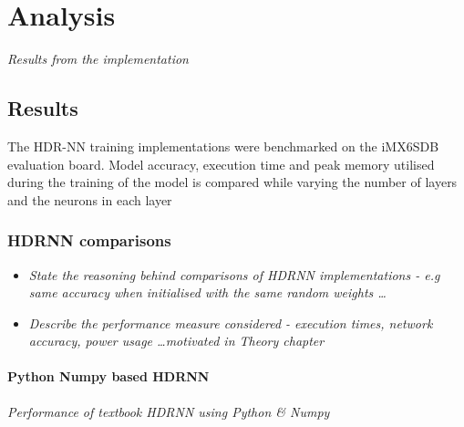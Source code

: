 \part{Analysis}
\textit{Results from the implementation}

\chapter{Results}

The HDR-NN training implementations were benchmarked on the iMX6SDB evaluation board. Model accuracy, execution time and peak memory utilised during the training of the model is compared while varying the number of layers and the neurons in each layer

\section{HDRNN comparisons}
\begin{itemize}
	\item \textit{State the reasoning behind comparisons of HDRNN implementations - e.g same accuracy when initialised with the same random weights \dots}
	\item \textit{Describe the performance measure considered - execution times, network accuracy, power usage \dots motivated in Theory chapter}

\end{itemize}

\subsection[Python - Numpy]{Python Numpy based HDRNN}
\textit{Performance of textbook HDRNN using Python \& Numpy}

\begin{center}
\end{center}

